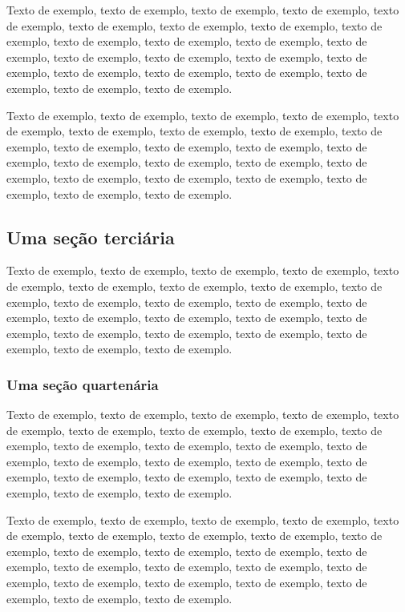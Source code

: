 \documentclass[
	12pt,				%
	oneside,			%
	a4paper,			%
	english,			%
	brazil				%
	]{abntex2ppgsi}
\begin{document}
Texto de exemplo, texto de exemplo, texto de exemplo, texto de exemplo, texto de exemplo, texto de exemplo, texto de exemplo, texto de exemplo, texto de exemplo, texto de exemplo, texto de exemplo, texto de exemplo, texto de exemplo, texto de exemplo, texto de exemplo, texto de exemplo, texto de exemplo, texto de exemplo, texto de exemplo, texto de exemplo, texto de exemplo, texto de exemplo, texto de exemplo.

Texto de exemplo, texto de exemplo, texto de exemplo, texto de exemplo, texto de exemplo, texto de exemplo, texto de exemplo, texto de exemplo, texto de exemplo, texto de exemplo, texto de exemplo, texto de exemplo, texto de exemplo, texto de exemplo, texto de exemplo, texto de exemplo, texto de exemplo, texto de exemplo, texto de exemplo, texto de exemplo, texto de exemplo, texto de exemplo, texto de exemplo.

\subsection{Uma seção terciária}

Texto de exemplo, texto de exemplo, texto de exemplo, texto de exemplo, texto de exemplo, texto de exemplo, texto de exemplo, texto de exemplo, texto de exemplo, texto de exemplo, texto de exemplo, texto de exemplo, texto de exemplo, texto de exemplo, texto de exemplo, texto de exemplo, texto de exemplo, texto de exemplo, texto de exemplo, texto de exemplo, texto de exemplo, texto de exemplo, texto de exemplo.

\subsubsection{Uma seção quartenária}

Texto de exemplo, texto de exemplo, texto de exemplo, texto de exemplo, texto de exemplo, texto de exemplo, texto de exemplo, texto de exemplo, texto de exemplo, texto de exemplo, texto de exemplo, texto de exemplo, texto de exemplo, texto de exemplo, texto de exemplo, texto de exemplo, texto de exemplo, texto de exemplo, texto de exemplo, texto de exemplo, texto de exemplo, texto de exemplo, texto de exemplo.


Texto de exemplo, texto de exemplo, texto de exemplo, texto de exemplo, texto de exemplo, texto de exemplo, texto de exemplo, texto de exemplo, texto de exemplo, texto de exemplo, texto de exemplo, texto de exemplo, texto de exemplo, texto de exemplo, texto de exemplo, texto de exemplo, texto de exemplo, texto de exemplo, texto de exemplo, texto de exemplo, texto de exemplo, texto de exemplo, texto de exemplo.
\end{document}
